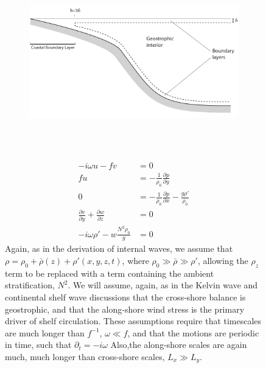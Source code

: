 \documentclass[11pt]{report}
\numberwithin{equation}{section}
\begin{document}
\begin{figure}
\begin{figure}[t]
    \centering
        \includegraphics[height=3in]{shelf_cross-section.pdf}
    \caption{}
    \label{fig:shelf_cross-section}
\end{figure}

\begin{align}
    - i \omega u - fv &= 0 \label{eq:csw_xmoment}\\
    fu &= -\frac{1}{\rho_0}\frac{\partial p}{\partial y} \label{eq:csw_ymoment}\\
    0 &= -\frac{1}{\rho_0}\frac{\partial p}{\partial x} - \frac{g \rho'}{\rho_0} \label{eq:csw_hydrostatic}\\
    \frac{\partial v}{\partial y} + \frac{\partial w}{\partial z} &= 0 \label{eq:csw_continuity}\\
    -i \omega \rho' - w\frac{N^2 \rho_0}{g} &= 0 \label{eq:csw_density}
\end{align}
Again, as in the derivation of internal waves, we assume that $\rho = \rho_0 + \bar{\rho}(z) + \rho'(x, y, z, t)$, where $\rho_0 \gg \bar{\rho} \gg \rho'$, allowing the $\rho_z$ term to be replaced with a term containing the ambient stratification, $N^2$.  We will assume, again, as in the Kelvin wave and continental shelf wave discussions that the cross-shore balance is geostrophic, and that the along-shore wind stress is the primary driver of shelf circulation.  These assumptions require that timescales are much longer than $f^{-1}$, $\omega \ll f$, and that the motions are periodic in time, such that $\partial_t = -i \omega$ Also,the along-shore scales are again much, much longer than cross-shore scales, $L_x \gg L_y$.


\end{figure}
\end{document}
